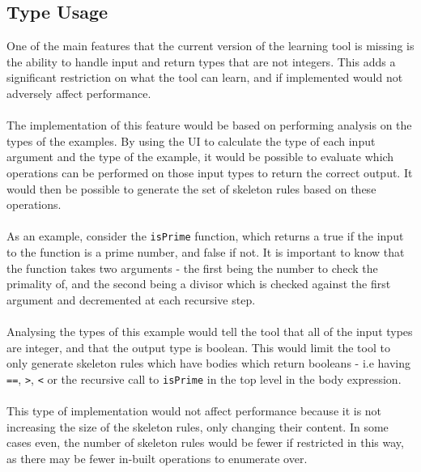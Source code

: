 \subsection{Type Usage}
One of the main features that the current version of the learning tool is missing is the ability to handle input and return types that are not integers. This adds a significant restriction on what the tool can learn, and if implemented would not adversely affect performance. \\ \\
The implementation of this feature would be based on performing analysis on the types of the examples. By using the UI to calculate the type of each input argument and the type of the example, it would be possible to evaluate which operations can be performed on those input types to return the correct output. It would then be possible to generate the set of skeleton rules based on these operations. \\ \\
As an example, consider the \lstinline{isPrime} function, which returns a true if the input to the function is a prime number, and false if not. It is important to know that the function takes two arguments - the first being the number to check the primality of, and the second being a divisor which is checked against the first argument and decremented at each recursive step. \\ \\ %
Analysing the types of this example would tell the tool that all of the input types are integer, and that the output type is boolean. This would limit the tool to only generate skeleton rules which have bodies which return booleans - i.e having \lstinline{==}, \lstinline{>}, \lstinline{<} or the recursive call to \lstinline{isPrime} in the top level in the body expression. \\ \\
This type of implementation would not affect performance because it is not increasing the size of the skeleton rules, only changing their content. In some cases even, the number of skeleton rules would be fewer if restricted in this way, as there may be fewer in-built operations to enumerate over.

